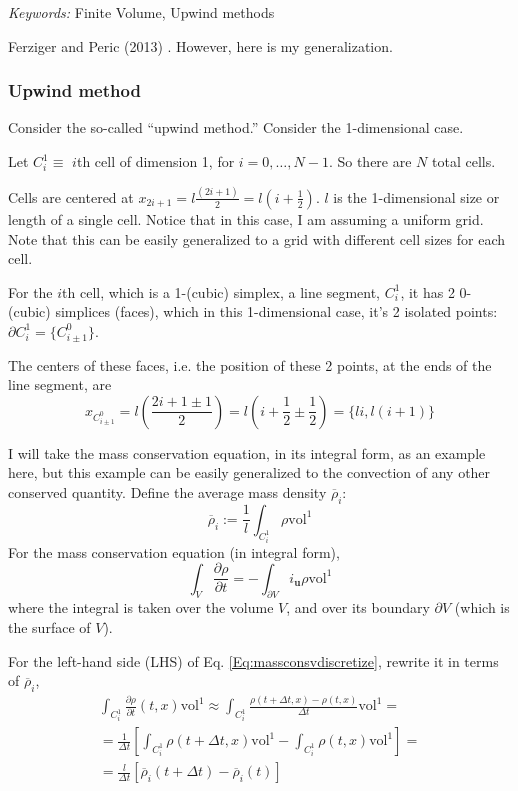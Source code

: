\documentclass[10pt]{amsart}
\begin{document}
\begin{multicols*}{2}
\emph{Keywords:} Finite Volume, Upwind methods

Ferziger and Peric (2013) \cite{JFMP2013}.  However, here is my generalization.

\subsubsection{Upwind method}

Consider the so-called ``upwind method.''  Consider the 1-dimensional case.

Let $C_i^1 \equiv $ $i$th cell of dimension 1, for $i = 0, \dots , N-1$.  So there are $N$ total cells.

Cells are centered at $x_{2i+1} = l \frac{ (2i+1)}{2} = l(i + \frac{1}{2})$.  $l$ is the 1-dimensional size or length of a single cell.  Notice that in this case, I am assuming a uniform grid.  Note that this can be easily generalized to a grid with different cell sizes for each cell.  

For the $i$th cell, which is a 1-(cubic) simplex, a line segment, $C_i^1$, it has 2 $0$-(cubic) simplices (faces), which in this 1-dimensional case, it's 2 isolated points: $\partial C_i^1 = \lbrace C^0_{i \pm 1} \rbrace$.

The centers of these faces, i.e. the position of these 2 points, at the ends of the line segment, are
\[
x_{C^0_{i \pm 1} } = l \left( \frac{2i  +1 \pm 1 }{2} \right) = l ( i + \frac{1}{2} \pm \frac{1}{2} ) = \lbrace li, l(i+1) \rbrace
\]

I will take the mass conservation equation, in its integral form, as an example here, but this example can be easily generalized to the convection of any other conserved quantity.  Define the average mass density $\overline{\rho}_i$:
\begin{equation}
  \overline{\rho}_i := \frac{1}{l} \int_{C_i^1} \rho \text{vol}^1
\end{equation}
For the mass conservation equation (in integral form),
\begin{equation}\label{Eq:massconsvdiscretize}
\int_V  \frac{ \partial \rho}{ \partial t} = - \int_{\partial V} i_{\mathbf{u}}\rho \text{vol}^1
  \end{equation}
where the integral is taken over the volume $V$, and over its boundary $\partial V$ (which is the surface of $V$).

For the left-hand side (LHS) of Eq. \ref{Eq:massconsvdiscretize}, rewrite it in terms of $\overline{\rho}_i$,
\[
\begin{gathered}
  \int_{C_i^1} \frac{  \partial \rho}{ \partial t}(t,x) \text{vol}^1 \approx \int_{C_i^1} \frac{ \rho(t+\Delta t, x) - \rho(t,x) }{ \Delta t} \text{vol}^1 = \\
  = \frac{1}{ \Delta t} \left[ \int_{C_i^1} \rho(t+\Delta t,x) \text{vol}^1 - \int_{C_i^1} \rho(t,x) \text{vol}^1 \right] = \\
  = \frac{l}{\Delta t} \left[ \overline{\rho}_i(t+\Delta t) - \overline{\rho}_i(t) \right]
  \end{gathered}
\]


\end{multicols*}
\end{document}
